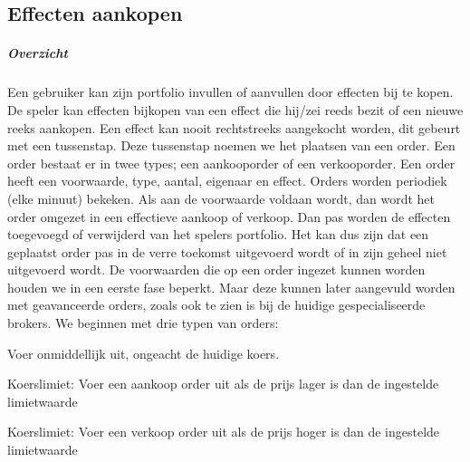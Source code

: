 \subsection{Effecten aankopen}
\begin{compact}

\subparagraph{Overzicht}Een gebruiker kan zijn portfolio invullen of aanvullen door effecten bij te kopen. De speler kan effecten bijkopen van een effect die hij/zei reeds bezit of een nieuwe reeks aankopen. Een effect kan nooit rechtstreeks aangekocht worden, dit gebeurt met een tussenstap. Deze tussenstap noemen we het plaatsen van een order. Een order bestaat er in twee types; een aankooporder of een verkooporder. Een order heeft een voorwaarde, type, aantal, eigenaar en effect. Orders worden periodiek (elke minuut) bekeken. Als aan de voorwaarde voldaan wordt, dan wordt het order omgezet in een effectieve aankoop of verkoop. Dan pas worden de effecten toegevoegd of verwijderd van het spelers portfolio. Het kan dus zijn dat een geplaatst order pas in de verre toekomst uitgevoerd wordt of in zijn geheel niet uitgevoerd wordt. De voorwaarden die op een order ingezet kunnen worden houden we in een eerste fase beperkt. Maar deze kunnen later aangevuld worden met geavanceerde orders, zoals ook te zien is bij de huidige gespecialiseerde brokers. We beginnen met drie typen van orders:

\begin{itemize_compact}
 \item Voer onmiddellijk uit, ongeacht de huidige koers.
 \item Koerslimiet: Voer een aankoop order uit als de prijs lager is dan de ingestelde limietwaarde
 \item Koerslimiet: Voer een verkoop order uit als de prijs hoger is dan de ingestelde limietwaarde
\end{itemize_compact}


\end{compact}
